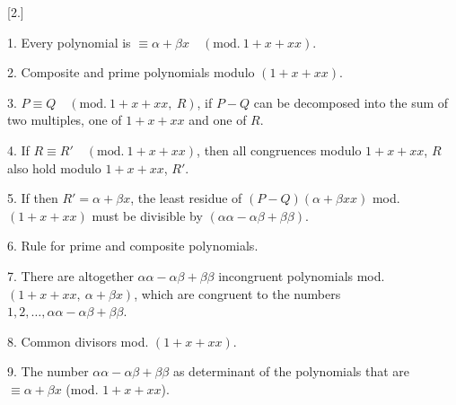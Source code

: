 \clearpage{}
\begin{center}\end{center}
\begin{center}[2.]\end{center}
\noindent\hspace*{\parindent}1. Every polynomial is $\equiv \alpha+\beta x \quad(\mathrm{mod.}\ 1+x+xx)$.

2. Composite and prime polynomials modulo $(1+x+xx)$.

3. $P \equiv Q \quad(\mathrm{mod.}\ 1+x+xx,\ R)$,
if $P-Q$ can be decomposed into the sum of two multiples, one of $1+x+xx$ and one of $R$.

4. If $R \equiv R' \quad(\mathrm{mod.}\ 1+x+xx)$, then all congruences modulo
$1+x+xx$, $R$ also hold modulo $1+x+xx$, $R'$.

5. If then $R' = \alpha+\beta x$, the least residue of
$(P-Q)(\alpha+\beta xx)$ mod. $(1+x+xx)$ must be divisible by
$(\alpha\alpha-\alpha\beta+\beta\beta)$.

6. Rule for prime and composite polynomials.

7. There are altogether $\alpha\alpha-\alpha\beta+\beta\beta$ incongruent
polynomials mod. $(1+x+xx,\ \alpha+\beta x)$, which are congruent to the numbers $1, 2, \ldots,
\alpha\alpha-\alpha\beta+\beta\beta$.

8. Common divisors mod. $(1+x+xx)$.

9. The number $\alpha\alpha-\alpha\beta+\beta\beta$ as determinant of the polynomials
that are $\equiv \alpha+\beta x$ (mod. $1+x+xx$).

